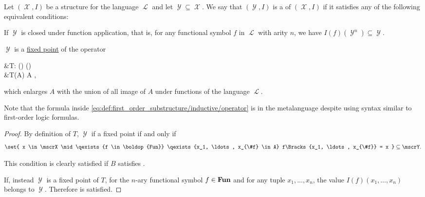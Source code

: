 \begin{definition}\label{def:first_order_substructure}
  Let \( (\mscrX, I) \) be a structure for the language \( \mscrL \) and let \( \mscrY \subseteq \mscrX \). We say that \( (\mscrY, I) \) is a  of \( (\mscrX, I) \) if it satisfies any of the following equivalent conditions:

  \begin{thmenum}
     If \( \mscrY \) is closed under function application, that is, for any functional symbol \( f \) in \( \mscrL \) with arity \( n \), we have \( I(f)(\mscrY^n) \subseteq \mscrY \).

     \( \mscrY \) is a \hyperref[def:fixed_point]{fixed point} of the operator
    \begin{alignedeq}\label{eq:def:first_order_substructure/inductive/operator}
      &T: \pow(\mscrX) \to \pow(\mscrX) \\
      &T(A) \coloneqq A \cup {},
    \end{alignedeq}
    which enlarges \( A \) with the union of all image of \( A \) under functions of the language \( \mscrL \).

    Note that the formula inside \eqref{eq:def:first_order_substructure/inductive/operator} is in the metalanguage despite using syntax similar to first-order logic formulas.
  \end{thmenum}
\end{definition}
\begin{proof}
  By definition of \( T \), \( \mscrY \) if a fixed point if and only if
  \begin{equation*}
    \set{ x \in \mscrX \mid \qexists{f \in \boldop{Fun}} \qexists{x_1, \ldots, x_{\#f} \in A} f\Bracks{x_1, \ldots, x_{\#f}} = x } \subseteq \mscrY.
  \end{equation*}

  This condition is clearly satisfied if \( B \) satisfies .

  If, instead \( \mscrY \) is a fixed point of \( T \), for the \( n \)-ary functional symbol \( f \in \operatorname{\mathbf{Fun}} \) and for any tuple \( x_1, \ldots, x_n \), the value \( I(f)(x_1, \ldots, x_n) \) belongs to \( \mscrY \). Therefore  is satisfied.
\end{proof}

